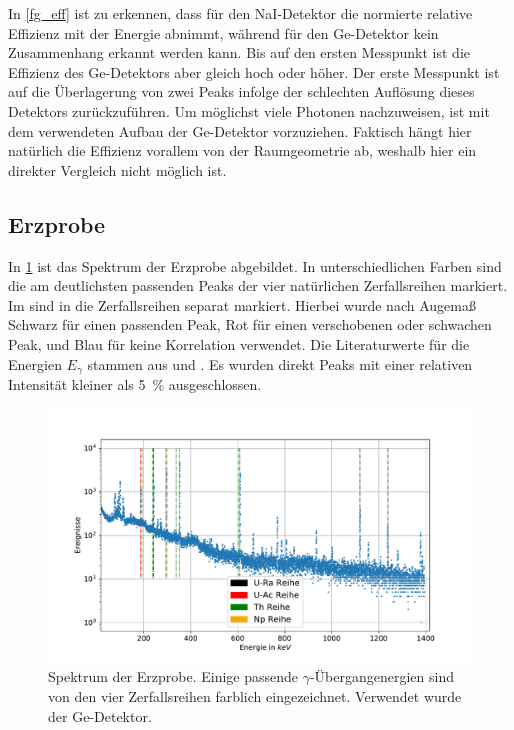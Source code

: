 \documentclass[
	a4paper,
	12pt,
	pagesize,
	ngerman
]{scrartcl}
\begin{document}
In \cref{fg_eff} ist zu erkennen, dass für den NaI-Detektor die normierte relative Effizienz mit der Energie abnimmt, während für den Ge-Detektor kein Zusammenhang erkannt werden kann.
Bis auf den ersten Messpunkt ist die Effizienz des Ge-Detektors aber gleich hoch oder höher.
Der erste Messpunkt ist auf die Überlagerung von zwei Peaks infolge der schlechten Auflösung dieses Detektors zurückzuführen.
Um möglichst viele Photonen nachzuweisen, ist mit dem verwendeten Aufbau der Ge-Detektor vorzuziehen.
Faktisch hängt hier natürlich die Effizienz vorallem von der Raumgeometrie ab, weshalb hier ein direkter Vergleich nicht möglich ist.

\subsection{Erzprobe}
	In \cref{fg_erz} ist das Spektrum der Erzprobe abgebildet.
	In unterschiedlichen Farben sind die am deutlichsten passenden Peaks der vier natürlichen Zerfallsreihen markiert.
	Im  sind in  die Zerfallsreihen separat markiert.
	Hierbei wurde nach Augemaß Schwarz für einen passenden Peak, Rot für einen verschobenen oder schwachen Peak, und Blau für keine Korrelation verwendet.
	Die Literaturwerte für die Energien $E_\gamma$ stammen aus \cite{erze1} und \cite{erze2}.
	Es wurden direkt Peaks mit einer relativen Intensität kleiner als \SI{5}{\percent} ausgeschlossen.

	\begin{figure}[H]
			\includegraphics[width= 1 \linewidth]{img/erz_alles}
			\caption{
			Spektrum der Erzprobe. Einige passende $\gamma$-Übergangenergien sind von den vier Zerfallsreihen farblich eingezeichnet. Verwendet wurde der Ge-Detektor.
			}
			\label{fg_erz}
	\end{figure}
\end{document}
